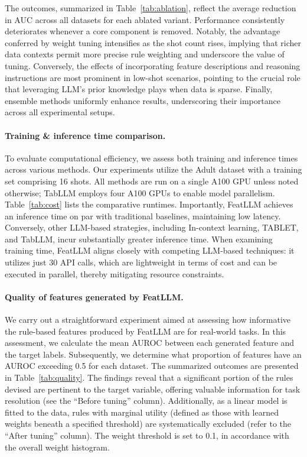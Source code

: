 The outcomes, summarized in Table~\ref{tab:ablation}, reflect the average reduction in AUC across all datasets for each ablated variant. Performance consistently deteriorates whenever a core component is removed. Notably, the advantage conferred by weight tuning intensifies as the shot count rises, implying that richer data contexts permit more precise rule weighting and underscore the value of tuning. Conversely, the effects of incorporating feature descriptions and reasoning instructions are most prominent in low-shot scenarios, pointing to the crucial role that leveraging LLM’s prior knowledge plays when data is sparse. Finally, ensemble methods uniformly enhance results, underscoring their importance across all experimental setups.

\vspace*{-0.12in}
\paragraph{Training \& inference time comparison.} To evaluate computational efficiency, we assess both training and inference times across various methods. Our experiments utilize the Adult dataset with a training set comprising 16 shots. All methods are run on a single A100 GPU unless noted otherwise; TabLLM employs four A100 GPUs to enable model parallelism. Table~\ref{tab:cost} lists the comparative runtimes. Importantly, \textsf{FeatLLM} achieves an inference time on par with traditional baselines, maintaining low latency. Conversely, other LLM-based strategies, including In-context learning, TABLET, and TabLLM, incur substantially greater inference time. When examining training time, \textsf{FeatLLM} aligns closely with competing LLM-based techniques: it utilizes just 30 API calls, which are lightweight in terms of cost and can be executed in parallel, thereby mitigating resource constraints.

\vspace*{-0.12in}
\paragraph{Quality of features generated by \textsf{FeatLLM}.}
We carry out a straightforward experiment aimed at assessing how informative the rule-based features produced by \textsf{FeatLLM} are for real-world tasks. In this assessment, we calculate the mean AUROC between each generated feature and the target labels. Subsequently, we determine what proportion of features have an AUROC exceeding 0.5 for each dataset. 
The summarized outcomes are presented in Table~\ref{tab:quality}. The findings reveal that a significant portion of the rules devised are pertinent to the target variable, offering valuable information for task resolution (see the ``Before tuning'' column). Additionally, as a linear model is fitted to the data, rules with marginal utility (defined as those with learned weights beneath a specified threshold) are systematically excluded (refer to the ``After tuning'' column). The weight threshold is set to 0.1, in accordance with the overall weight histogram.

